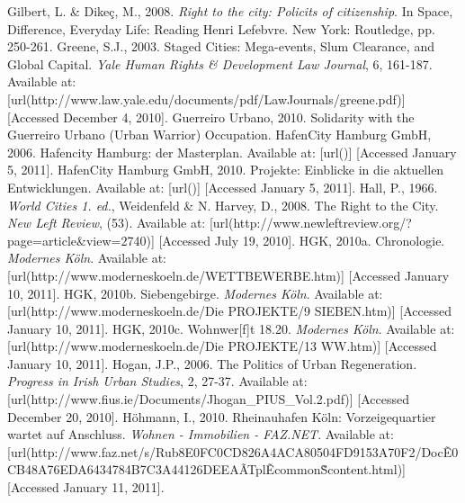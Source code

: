 {%
Gilbert, L. \& Dikeç, M., 2008. {\em Right to the city: Policits of citizenship}. In Space, Difference, Everyday Life: Reading Henri Lefebvre.  New York: Routledge, pp. 250-261. \nl%
%
Greene, S.J., 2003. Staged Cities: Mega-events, Slum Clearance, and Global Capital. {\em Yale Human Rights \& Development Law Journal}, 6, 161-187. Available at:  [url(http://www.law.yale.edu/documents/pdf/LawJournals/greene.pdf)] [Accessed December 4, 2010]. \nl%
%
Guerreiro Urbano, 2010. Solidarity with the Guerreiro Urbano (Urban Warrior) Occupation. \nl%
%
HafenCity Hamburg GmbH, 2006. Hafencity Hamburg: der Masterplan. Available at: \goto{\hyphenatedurl{}} [url()] [Accessed January 5, 2011]. \nl%
%
HafenCity Hamburg GmbH, 2010. Projekte: Einblicke in die aktuellen Entwicklungen. Available at: \goto{\hyphenatedurl{}} [url()] [Accessed January 5, 2011]. \nl%
%
Hall, P., 1966. {\em World Cities 1. ed.}, Weidenfeld \& N. \nl%
%
Harvey, D., 2008. The Right to the City. {\em New Left Review}, (53). Available at:  [url(http://www.newleftreview.org/?page=article&view=2740)] [Accessed July 19, 2010]. \nl%
%
HGK, 2010a. Chronologie. {\em Modernes Köln}. Available at:  [url(http://www.moderneskoeln.de/WETTBEWERBE.htm)] [Accessed January 10, 2011]. \nl%
%
HGK, 2010b. Siebengebirge. {\em Modernes Köln}. Available at:  [url(http://www.moderneskoeln.de/Die PROJEKTE/9 SIEBEN.htm)] [Accessed January 10, 2011]. \nl%
%
HGK, 2010c. Wohnwer[f]t 18.20. {\em Modernes Köln}. Available at:  [url(http://www.moderneskoeln.de/Die PROJEKTE/13 WW.htm)] [Accessed January 10, 2011]. \nl%
%
Hogan, J.P., 2006. The Politics of Urban Regeneration. {\em Progress in Irish Urban Studies}, 2, 27-37. Available at:  [url(http://www.fius.ie/Documents/Jhogan_PIUS_Vol.2.pdf)] [Accessed December 20, 2010]. \nl%
%
Höhmann, I., 2010. Rheinauhafen Köln: Vorzeigequartier wartet auf Anschluss. {\em Wohnen - Immobilien - FAZ.NET}. Available at:  [url(http://www.faz.net/s/Rub8E0FC0CD826A4ACA80504FD9153A70F2/Doc\~E0CB48A76EDA6434784B7C3A44126DEEA\~ATpl\~Ecommon\~Scontent.html)] [Accessed January 11, 2011]. \nl%
}
